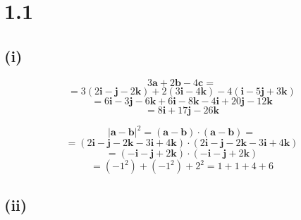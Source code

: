 \documentclass{article}
\begin{document}
\section*{1.1}

\subsection*{(i)}
\begin{equation*}
    3 \textbf{a} + 2 \textbf{b} - 4 \textbf{c} = 
\end{equation*}
\begin{equation*}
    = 3(2 \textbf{i} - \textbf{j} - 2 \textbf{k}) + 2(3 \textbf{i} - 4 \textbf{k}) - 4(\textbf{i} - 5 \textbf{j} + 3 \textbf{k})
\end{equation*}
\begin{equation*}
    = 6\textbf{i} - 3\textbf{j} - 6\textbf{k} + 6\textbf{i} - 8\textbf{k} - 4\textbf{i} + 20\textbf{j} - 12\textbf{k}
\end{equation*}
\begin{equation*}
    = 8\textbf{i} + 17\textbf{j} -26\textbf{k}
\end{equation*}

\begin{equation*}
    |\textbf{a} - \textbf{b}|^2 = (\textbf{a} - \textbf{b}) \cdot (\textbf{a} - \textbf{b}) = 
\end{equation*}
\begin{equation*}
    = (2\textbf{i} - \textbf{j} -2\textbf{k} - 3\textbf{i} + 4\textbf{k}) \cdot (2\textbf{i} - \textbf{j} -2\textbf{k} - 3\textbf{i} + 4\textbf{k})
\end{equation*}
\begin{equation*}
    = (- \textbf{i} - \textbf{j} +2 \textbf{k} ) \cdot (- \textbf{i} - \textbf{j} +2 \textbf{k} )
\end{equation*}
\begin{equation*}
    = (-1^2) + (-1^2) + 2^2 = 1 + 1 + 4 + 6
\end{equation*}

\subsection*{(ii)}
\end{document}
